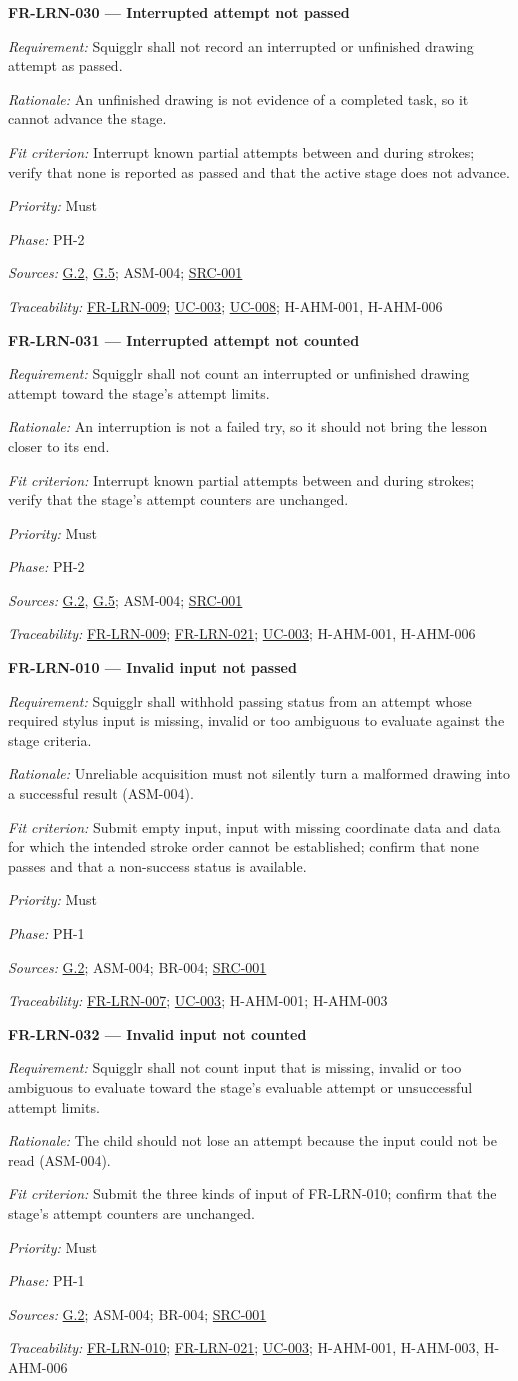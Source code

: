 \documentclass[12pt]{article}
\renewcommand{\_}{\textunderscore\allowbreak}%
\newcommand{\goalref}[1]{\hyperref[goal:#1]{G.#1}}
\newcommand{\ucref}[1]{\hyperref[uc:#1]{\mbox{UC-#1}}}
\newenvironment{srsrequirement}[2]{%
  \par\medskip\noindent\phantomsection\label{req:#1}%
  \textbf{#1 --- #2}\par\nobreak\smallskip }{\par\medskip}
\newcommand{\reqfield}[2]{\noindent\textit{#1:} #2\par}
\newcommand{\reqshall}[1]{\reqfield{Requirement}{#1}}
\newcommand{\reqrationale}[1]{\reqfield{Rationale}{#1}}
\newcommand{\reqfit}[1]{\reqfield{Fit criterion}{#1}}
\newcommand{\reqpriority}[1]{\reqfield{Priority}{#1}}
\newcommand{\reqphase}[1]{\reqfield{Phase}{#1}}
\newcommand{\reqsources}[1]{\reqfield{Sources}{#1}}
\newcommand{\reqtraces}[1]{\reqfield{Traceability}{#1}}
\newcommand{\reqref}[1]{\hyperref[req:#1]{#1}}
\newcommand{\srcref}[1]{\hyperref[src:#1]{SRC-#1}}
\providecommand{\ucref}[1]{\hyperref[uc:#1]{UC-#1}}
\begin{document}
\begin{srsrequirement}{FR-LRN-030}{Interrupted attempt not passed}
  \reqshall{Squigglr shall not record an interrupted or unfinished drawing
attempt as passed.} \reqrationale{An unfinished drawing is not evidence of a
completed task, so it cannot advance the stage.} \reqfit{Interrupt known
partial attempts between and during strokes; verify that none is reported as
passed and that the active stage does not advance.}
  \reqpriority{Must}
  \reqphase{PH-2}
  \reqsources{\goalref{2}, \goalref{5}; ASM-004; \srcref{001}}
  \reqtraces{\reqref{FR-LRN-009}; \ucref{003}; \ucref{008}; H-AHM-001,
  H-AHM-006}
\end{srsrequirement}

\begin{srsrequirement}{FR-LRN-031}{Interrupted attempt not counted}
  \reqshall{Squigglr shall not count an interrupted or unfinished drawing
attempt toward the stage's attempt limits.} \reqrationale{An interruption is
not a failed try, so it should not bring the lesson closer to its end.}
\reqfit{Interrupt known partial attempts between and during strokes; verify
that the stage's attempt counters are unchanged.}
  \reqpriority{Must}
  \reqphase{PH-2}
  \reqsources{\goalref{2}, \goalref{5}; ASM-004; \srcref{001}}
  \reqtraces{\reqref{FR-LRN-009}; \reqref{FR-LRN-021}; \ucref{003};
  H-AHM-001, H-AHM-006}
\end{srsrequirement}

\begin{srsrequirement}{FR-LRN-010}{Invalid input not passed}
  \reqshall{Squigglr shall withhold passing status from an attempt whose
required stylus input is missing, invalid or too ambiguous to evaluate against
the stage criteria.} \reqrationale{Unreliable acquisition must not silently
turn a malformed drawing into a successful result (ASM-004).} \reqfit{Submit
empty input, input with missing coordinate data and data for which the intended
stroke order cannot be established; confirm that none passes and that a
non-success status is available.}
  \reqpriority{Must}
  \reqphase{PH-1}
  \reqsources{\goalref{2}; ASM-004; BR-004; \srcref{001}}
  \reqtraces{\reqref{FR-LRN-007}; \ucref{003}; H-AHM-001; H-AHM-003}
\end{srsrequirement}

\begin{srsrequirement}{FR-LRN-032}{Invalid input not counted}
  \reqshall{Squigglr shall not count input that is missing, invalid or too
ambiguous to evaluate toward the stage's evaluable attempt or unsuccessful
attempt limits.} \reqrationale{The child should not lose an attempt because
the input could not be read (ASM-004).} \reqfit{Submit the three kinds of input
of FR-LRN-010; confirm that the stage's attempt counters are unchanged.}
  \reqpriority{Must}
  \reqphase{PH-1}
  \reqsources{\goalref{2}; ASM-004; BR-004; \srcref{001}}
  \reqtraces{\reqref{FR-LRN-010}; \reqref{FR-LRN-021}; \ucref{003}; H-AHM-001,
  H-AHM-003, H-AHM-006}
\end{srsrequirement}
\end{document}
